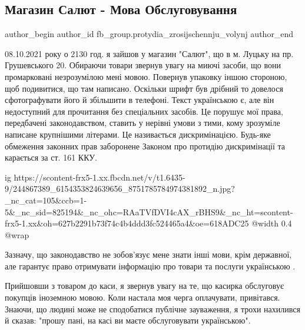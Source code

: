  
 
 
 
 
 
\subsection{Магазин Салют - Мова Обслуговування}
\label{sec:08_10_2021.fb.fb_group.protydia_zrosijschennju_volynj.1.magazin_salut_mova_luck}
 
\ifcmt
 author_begin
   author_id fb_group.protydia_zrosijschennju_volynj
 author_end
\fi

08.10.2021 року о 2130 год. я зайшов у магазин "Салют", що в м. Луцьку на пр.
Грушевського 20. Обираючи товари звернув увагу на миючі засоби, що вони
промарковані незрозумілою мені мовою. Повернув упаковку іншою стороною, щоб
подивитися, що там написано. Оскільки шрифт був дрібний то довелося
сфотографувати його й збільшити в телефоні. Текст українською є, але він
недоступний для прочитання без спеціальних засобів. Це порушує мої права,
передбачені законодавством, ставить у нерівні умови з тими, кому зрозуміле
написане крупнішими літерами. Це називається дискримінацією. Будь-яке обмеження
законних прав заборонене Законом про протидію дискримінації та карається за ст.
161 ККУ. 

\ifcmt
  ig https://scontent-frx5-1.xx.fbcdn.net/v/t1.6435-9/244867389_6154353824639656_8751785784974381892_n.jpg?_nc_cat=105&ccb=1-5&_nc_sid=825194&_nc_ohc=RAaTVfDVI4cAX_rBHS9&_nc_ht=scontent-frx5-1.xx&oh=627b2291b73f74c4b4ddd3fc524465a4&oe=618ADC25
  @width 0.4
  @wrap 
\fi

Зазначу, що законодавство не зобов'язує мене знати інші мови, крім державної,
але гарантує право отримувати інформацію про товари та послуги українською . 

Прийшовши з товаром до каси, я звернув увагу на те, що касирка обслуговує
покупців іноземною мовою. Коли настала моя черга оплачувати,  привітався.
Знаючи, що людині може не сподобатися публічне зауваження, я трохи нахилився й
сказав: "прошу пані, на касі ви маєте обслуговувати українською".

